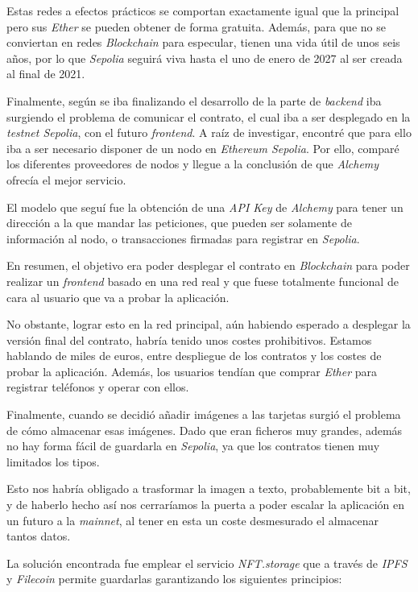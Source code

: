 Estas redes a efectos prácticos se comportan exactamente igual que la principal pero sus \textit{Ether} se pueden obtener de forma gratuita. Además, para que no se conviertan en redes \textit{Blockchain} para especular, tienen una vida útil de unos seis años, por lo que \textit{Sepolia} seguirá viva hasta el uno de enero de 2027 al ser creada al final de 2021.

Finalmente, según se iba finalizando el desarrollo de la parte de \textit{backend} iba surgiendo el problema de comunicar el contrato, el cual iba a ser desplegado en la \textit{testnet Sepolia},  con el futuro \textit{frontend}. A raíz de investigar, encontré que para ello iba a ser necesario disponer de un nodo en \textit{Ethereum Sepolia}. Por ello, comparé los diferentes proveedores de nodos\cite{ethereumNodesService} y llegue a la conclusión de que \textit{Alchemy} ofrecía el mejor servicio.

El modelo que seguí fue la obtención de una \textit{API Key}\cite{alchemyAlchemyQuickstart} de \textit{Alchemy} para tener un dirección a la que mandar las peticiones, que pueden ser solamente de información al nodo, o transacciones firmadas para registrar en \textit{Sepolia}.

En resumen, el objetivo era poder desplegar el contrato en \textit{Blockchain} para poder realizar un \textit{frontend} basado en una red real y que fuese totalmente funcional de cara al usuario que va a probar la aplicación.

No obstante, lograr esto en la red principal, aún habiendo esperado a desplegar la versión final del contrato, habría tenido unos costes prohibitivos. Estamos hablando de miles de euros, entre despliegue de los contratos y los costes de probar la aplicación. Además, los usuarios tendían que comprar \textit{Ether} para registrar teléfonos y operar con ellos.

Finalmente, cuando se decidió añadir imágenes a las tarjetas surgió el problema de cómo almacenar esas imágenes. Dado que eran ficheros muy grandes, además no hay forma fácil de guardarla en \textit{Sepolia}, ya que los contratos tienen muy limitados los tipos.

Esto nos habría obligado a trasformar la imagen a texto, probablemente bit a bit, y de haberlo hecho así nos cerraríamos la puerta a poder escalar la aplicación en un futuro a la \textit{mainnet}, al tener en esta un coste desmesurado el almacenar tantos datos.

La solución encontrada fue emplear el servicio \textit{NFT.storage} que a través de \textit{IPFS} y \textit{Filecoin} permite guardarlas garantizando los siguientes principios:

